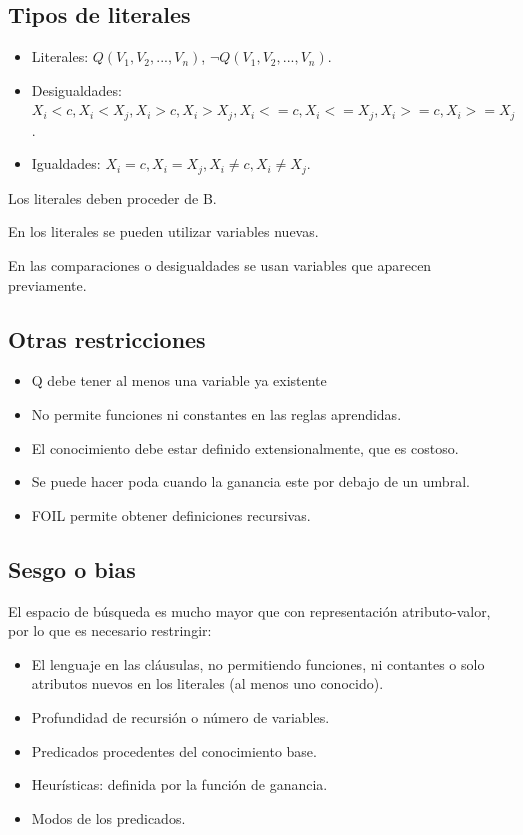\documentclass[12pt, twoside, openright]{report} %
\begin{document}
\subsection{Tipos de literales}
\begin{itemize}
	\item Literales: $Q(V_1, V_2, ..., V_n)$, $\neg Q(V_1, V_2, ..., V_n)$.
	\item Desigualdades: $X_i < c, X_i < X_j, X_i > c, X_i > X_j, X_i <= c, X_i <= X_j, X_i >= c, X_i >= X_j$.
	\item Igualdades: $X_i = c, X_i = X_j, X_i \neq c, X_i \neq X_j$.
\end{itemize}
Los literales deben proceder de B.

En los literales se pueden utilizar variables nuevas.

En las comparaciones o desigualdades se usan variables que aparecen previamente.

\subsection{Otras restricciones}
\begin{itemize}
	\item Q debe tener al menos una variable ya existente
	\item No permite funciones ni constantes en las reglas aprendidas.
	\item El conocimiento debe estar definido extensionalmente, que es costoso.
	\item Se puede hacer poda cuando la ganancia este por debajo de un umbral.
	\item FOIL permite obtener definiciones recursivas.
\end{itemize}

\subsection{Sesgo o bias}
El espacio de búsqueda es mucho mayor que con representación atributo-valor, por lo que es necesario restringir:
\begin{itemize}
	\item El lenguaje en las cláusulas, no permitiendo funciones, ni contantes o solo atributos nuevos en los literales (al menos uno conocido).
	\item Profundidad de recursión o número de variables.
	\item Predicados procedentes del conocimiento base.
	\item Heurísticas: definida por la función de ganancia.
	\item Modos de los predicados.
\end{itemize}
\end{document}

